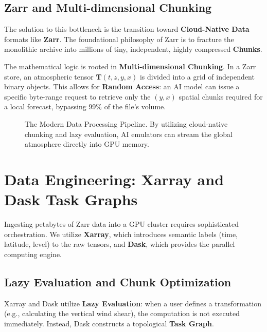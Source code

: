 \subsection{Zarr and Multi-dimensional Chunking}
The solution to this bottleneck is the transition toward \textbf{Cloud-Native Data} formats like \textbf{Zarr}. The foundational philosophy of Zarr is to fracture the monolithic archive into millions of tiny, independent, highly compressed \textbf{Chunks}. 

The mathematical logic is rooted in \textbf{Multi-dimensional Chunking}. In a Zarr store, an atmospheric tensor $\mathbf{T}(t, z, y, x)$ is divided into a grid of independent binary objects. This allows for \textbf{Random Access}: an AI model can issue a specific byte-range request to retrieve only the $(y, x)$ spatial chunks required for a local forecast, bypassing 99\% of the file's volume.

\begin{figure}[H]
\centering
{}
\caption{The Modern Data Processing Pipeline. By utilizing cloud-native chunking and lazy evaluation, AI emulators can stream the global atmosphere directly into GPU memory.}
\label{fig:modern_pipeline_tikz}
\end{figure}

\section{Data Engineering: Xarray and Dask Task Graphs}

Ingesting petabytes of Zarr data into a GPU cluster requires sophisticated orchestration. We utilize \textbf{Xarray}, which introduces semantic labels (time, latitude, level) to the raw tensors, and \textbf{Dask}, which provides the parallel computing engine.

\subsection{Lazy Evaluation and Chunk Optimization}
Xarray and Dask utilize \textbf{Lazy Evaluation}: when a user defines a transformation (e.g., calculating the vertical wind shear), the computation is not executed immediately. Instead, Dask constructs a topological \textbf{Task Graph}. 

